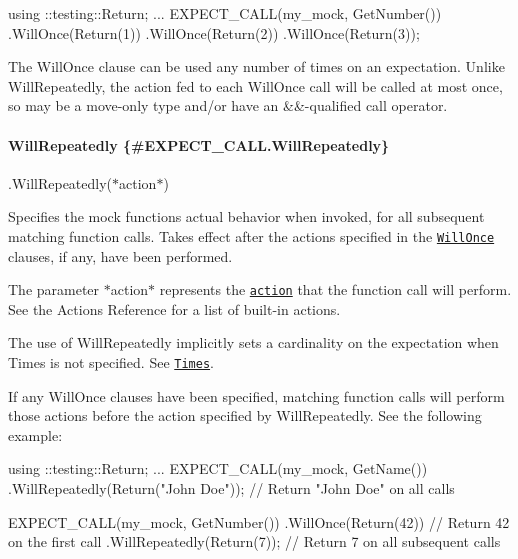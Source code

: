 \begin{DoxyCode}
using ::testing::Return;
...
EXPECT\_CALL(my\_mock, GetNumber())
    .WillOnce(Return(1))
    .WillOnce(Return(2))
    .WillOnce(Return(3));
\end{DoxyCode}


The {\ttfamily Will\+Once} clause can be used any number of times on an expectation. Unlike {\ttfamily Will\+Repeatedly}, the action fed to each {\ttfamily Will\+Once} call will be called at most once, so may be a move-\/only type and/or have an {\ttfamily \&\&}-\/qualified call operator.

\paragraph*{Will\+Repeatedly \{\#\+E\+X\+P\+E\+C\+T\+\_\+\+C\+A\+L\+L.\+Will\+Repeatedly\}}

{\ttfamily .Will\+Repeatedly(}$\ast${\ttfamily action}$\ast${\ttfamily )}

Specifies the mock function\textquotesingle{}s actual behavior when invoked, for all subsequent matching function calls. Takes effect after the actions specified in the \href{#EXPECT_CALL.WillOnce}{\tt {\ttfamily Will\+Once}} clauses, if any, have been performed.

The parameter $\ast${\ttfamily action}$\ast$ represents the \href{../gmock_for_dummies.md#actions-what-should-it-do}{\tt action} that the function call will perform. See the Actions Reference for a list of built-\/in actions.

The use of {\ttfamily Will\+Repeatedly} implicitly sets a cardinality on the expectation when {\ttfamily Times} is not specified. See \href{#EXPECT_CALL.Times}{\tt {\ttfamily Times}}.

If any {\ttfamily Will\+Once} clauses have been specified, matching function calls will perform those actions before the action specified by {\ttfamily Will\+Repeatedly}. See the following example\+:


\begin{DoxyCode}
using ::testing::Return;
...
EXPECT\_CALL(my\_mock, GetName())
    .WillRepeatedly(Return(\textcolor{stringliteral}{"John Doe"}));  \textcolor{comment}{// Return "John Doe" on all calls}

EXPECT\_CALL(my\_mock, GetNumber())
    .WillOnce(Return(42))        \textcolor{comment}{// Return 42 on the first call}
    .WillRepeatedly(Return(7));  \textcolor{comment}{// Return 7 on all subsequent calls}
\end{DoxyCode}


